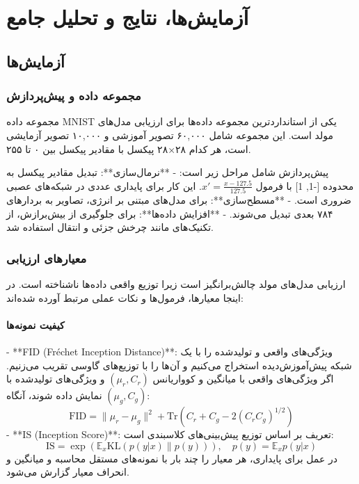 \renewcommand{\chaptername}{سوال}
\chapter{آزمایش‌ها، نتایج و تحلیل جامع}

\section{آزمایش‌ها}
\subsection{مجموعه داده و پیش‌پردازش}
مجموعه داده MNIST یکی از استانداردترین مجموعه داده‌ها برای ارزیابی مدل‌های مولد است. این مجموعه شامل ۶۰,۰۰۰ تصویر آموزشی و ۱۰,۰۰۰ تصویر آزمایشی است، هر کدام ۲۸×۲۸ پیکسل با مقادیر پیکسل بین ۰ تا ۲۵۵.

پیش‌پردازش شامل مراحل زیر است:
- **نرمال‌سازی**: تبدیل مقادیر پیکسل به محدوده [-1, 1] با فرمول \( x' = \frac{x - 127.5}{127.5} \). این کار برای پایداری عددی در شبکه‌های عصبی ضروری است.
- **مسطح‌سازی**: برای مدل‌های مبتنی بر انرژی، تصاویر به بردارهای ۷۸۴ بعدی تبدیل می‌شوند.
- **افزایش داده‌ها**: برای جلوگیری از بیش‌برازش، از تکنیک‌های مانند چرخش جزئی و انتقال استفاده شد.

\subsection{معیارهای ارزیابی}
ارزیابی مدل‌های مولد چالش‌برانگیز است زیرا توزیع واقعی داده‌ها ناشناخته است. در اینجا معیارها، فرمول‌ها و نکات عملی مرتبط آورده شده‌اند:

\subsubsection{کیفیت نمونه‌ها}
- **FID (Fréchet Inception Distance)**: ویژگی‌های واقعی و تولیدشده را با یک شبکه پیش‌آموزش‌دیده استخراج می‌کنیم و آن‌ها را با توزیع‌های گاوسی تقریب می‌زنیم. اگر ویژگی‌های واقعی با میانگین و کوواریانس \( (\mu_r, C_r) \) و ویژگی‌های تولیدشده با \( (\mu_g, C_g) \) نمایش داده شوند، آنگاه:
\[
\mathrm{FID} = \|\mu_r - \mu_g\|^2 + \mathrm{Tr}\left(C_r + C_g - 2( C_r C_g )^{1/2} \right)
\]
- **IS (Inception Score)**: تعریف بر اساس توزیع پیش‌بینی‌های کلاسبندی است:
\[
\mathrm{IS} = \exp\left( \mathbb{E}_x \mathrm{KL}\left( p(y|x) \| p(y) \right) \right), \quad p(y) = \mathbb{E}_x p(y|x)
\]
در عمل برای پایداری، هر معیار را چند بار با نمونه‌های مستقل محاسبه و میانگین و انحراف معیار گزارش می‌شود.

